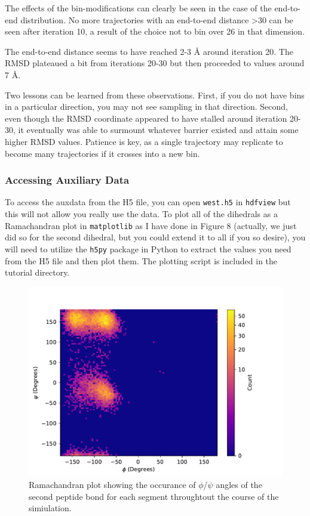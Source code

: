 \documentclass[9pt,tutorial,ASAPversion]{livecoms}
\begin{document}
The effects of the bin-modifications can clearly be seen in the case of the end-to-end distribution. 
No more trajectories with an end-to-end distance >30 can be seen after iteration 10, a result of the choice not to bin over 26 in that dimension.

The end-to-end distance seems to have reached 2-3 \AA{} around iteration 20. 
The RMSD plateaued a bit from iterations 20-30 but then proceeded to values around 7 \AA.  

Two lessons can be learned from these observations. 
First, if you do not have bins in a particular direction, you may not see sampling in that direction. 
Second, even though the RMSD coordinate appeared to have stalled around iteration 20-30, it eventually was able to surmount whatever barrier existed and attain some higher RMSD values. 
Patience is key, as a single trajectory may replicate to become many trajectories if it crosses into a new bin.

\subsubsection{Accessing Auxiliary Data}

To access the auxdata from the H5 file, you can open \verb|west.h5| in \verb|hdfview| but this will not allow you really use the data. 
To plot all of the dihedrals as a Ramachandran plot in \verb|matplotlib| as I have done in Figure 8 (actually, we just did so for the second dihedral, but you could extend it to all if you so desire), you will need to utilize the \verb|h5py| package in Python to extract the values you need from the H5 file and then plot them. 
The plotting script is included in the tutorial directory.

\begin{figure}
\includegraphics[width=\linewidth]{Figure8.pdf}
\caption{Ramachandran plot showing the occurance of $\phi$/$\psi$ angles of the second peptide bond for each segment throughtout the course of the simiulation.}
\label{fig:view}
\end{figure}
\end{document}
